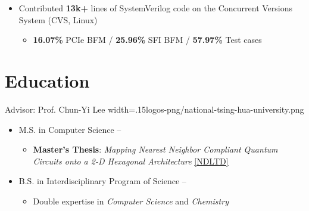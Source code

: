 \documentclass{cvclass}
\newcommand{\simplemmyy}[3]{\shortmmyyformat\formatdate{#3}{#2}{#1}}
\begin{document}
{\begin{itemize}
        \begin{itemize}
            \item {\textbf{67.33\%} Customer Issues / \textbf{27.56\%} Product Enhancements}
        \end{itemize}
        \item Contributed \textbf{13k+} lines of SystemVerilog code on the Concurrent Versions System (CVS, Linux)
        \begin{itemize}
            \item \textbf{16.07\%} PCIe BFM / \textbf{25.96\%} SFI BFM / \textbf{57.97\%} Test cases
        \end{itemize}
    \end{itemize}}


\section{Education}

        {Advisor: Prof. Chun-Yi Lee}
        {width=.15\linewidth}{logos-png/national-tsing-hua-university.png}{
    \begin{itemize}
        \item M.S. in Computer Science -- \textit{\simplemmyy{2021}{6}{30}} %
        \begin{itemize}
            \item \textbf{Master’s Thesis}: \textit{Mapping Nearest Neighbor Compliant Quantum Circuits onto a 2-D Hexagonal Architecture} \href{https://hdl.handle.net/11296/dpttkc}{[NDLTD]}
        \end{itemize}
        \item B.S. in Interdisciplinary Program of Science -- \textit{\simplemmyy{2017}{6}{30}} %
        \begin{itemize}
            \item Double expertise in \textit{Computer Science} and \textit{Chemistry}
        \end{itemize}
    \end{itemize}}


\makepublications
\end{document}
